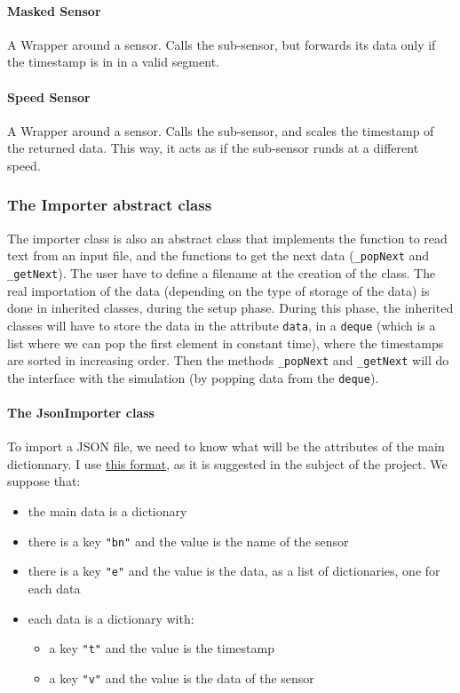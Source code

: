 \paragraph{Masked Sensor}

A Wrapper around a sensor. Calls the sub-sensor, but forwards its data only if
the timestamp is in in a valid segment.

\paragraph{Speed Sensor}

A Wrapper around a sensor. Calls the sub-sensor, and scales the timestamp of
the returned data. This way, it acts as if the sub-sensor runds at a different
speed.

\subsubsection{The Importer abstract class}

The importer class is also an abstract class that implements the function
to read text from an input file, and the functions to get the next data
(\verb!_popNext! and \verb!_getNext!). The user have to define a filename
at the creation of the class. The real importation of the data (depending
on the type of storage of the data) is done in inherited classes, during the
setup phase. During this phase, the inherited classes will have to store the
data in the attribute \verb!data!, in a \verb!deque! (which is a list where we can pop the first element in constant time), where the timestamps are sorted in increasing order. Then the methods
\verb!_popNext! and \verb!_getNext! will do the interface with the simulation
(by popping data from the \verb!deque!).

\paragraph{The JsonImporter class}

To import a JSON file, we need to know what
will be the attributes of the main dictionnary. I use
\href{https://github.com/SINTEF-9012/sensapp/tree/master/net.modelbased.sensapp.data.samples/CyclingData}{this format}, as it is suggested in the subject of the project. We suppose that:

\begin{itemize}
\item the main data is a dictionary
\item there is a key \verb!"bn"! and the value is the name of the sensor
\item there is a key \verb!"e"! and the value is the data, as a list of dictionaries, one for each data
\item each data is a dictionary with:
      \begin{itemize}
      \item a key \verb!"t"! and the value is the timestamp
      \item a key \verb!"v"! and the value is the data of the sensor
      \end{itemize}
\end{itemize}

